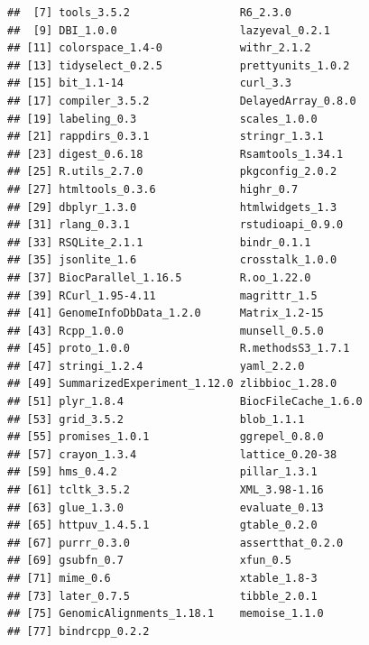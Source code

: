 \documentclass[12pt]{article}\usepackage[]{graphicx}\usepackage[]{color}
\makeatletter
\newenvironment{kframe}{%
 \def\at@end@of@kframe{}%
 \ifinner\ifhmode%
  \def\at@end@of@kframe{\end{minipage}}%
  \begin{minipage}{\columnwidth}%
 \fi\fi%
 \def\FrameCommand##1{\hskip\@totalleftmargin \hskip-\fboxsep
 \colorbox{shadecolor}{##1}\hskip-\fboxsep
     \hskip-\linewidth \hskip-\@totalleftmargin \hskip\columnwidth}%
 \MakeFramed {\advance\hsize-\width
   \@totalleftmargin\z@ \linewidth\hsize
   \@setminipage}}%
 {\par\unskip\endMakeFramed%
 \at@end@of@kframe}
\newenvironment{knitrout}{}{} %
\makeatother
\begin{document}
\begin{knitrout}
\begin{kframe}
\begin{verbatim}
##  [7] tools_3.5.2                 R6_2.3.0                   
##  [9] DBI_1.0.0                   lazyeval_0.2.1             
## [11] colorspace_1.4-0            withr_2.1.2                
## [13] tidyselect_0.2.5            prettyunits_1.0.2          
## [15] bit_1.1-14                  curl_3.3                   
## [17] compiler_3.5.2              DelayedArray_0.8.0         
## [19] labeling_0.3                scales_1.0.0               
## [21] rappdirs_0.3.1              stringr_1.3.1              
## [23] digest_0.6.18               Rsamtools_1.34.1           
## [25] R.utils_2.7.0               pkgconfig_2.0.2            
## [27] htmltools_0.3.6             highr_0.7                  
## [29] dbplyr_1.3.0                htmlwidgets_1.3            
## [31] rlang_0.3.1                 rstudioapi_0.9.0           
## [33] RSQLite_2.1.1               bindr_0.1.1                
## [35] jsonlite_1.6                crosstalk_1.0.0            
## [37] BiocParallel_1.16.5         R.oo_1.22.0                
## [39] RCurl_1.95-4.11             magrittr_1.5               
## [41] GenomeInfoDbData_1.2.0      Matrix_1.2-15              
## [43] Rcpp_1.0.0                  munsell_0.5.0              
## [45] proto_1.0.0                 R.methodsS3_1.7.1          
## [47] stringi_1.2.4               yaml_2.2.0                 
## [49] SummarizedExperiment_1.12.0 zlibbioc_1.28.0            
## [51] plyr_1.8.4                  BiocFileCache_1.6.0        
## [53] grid_3.5.2                  blob_1.1.1                 
## [55] promises_1.0.1              ggrepel_0.8.0              
## [57] crayon_1.3.4                lattice_0.20-38            
## [59] hms_0.4.2                   pillar_1.3.1               
## [61] tcltk_3.5.2                 XML_3.98-1.16              
## [63] glue_1.3.0                  evaluate_0.13              
## [65] httpuv_1.4.5.1              gtable_0.2.0               
## [67] purrr_0.3.0                 assertthat_0.2.0           
## [69] gsubfn_0.7                  xfun_0.5                   
## [71] mime_0.6                    xtable_1.8-3               
## [73] later_0.7.5                 tibble_2.0.1               
## [75] GenomicAlignments_1.18.1    memoise_1.1.0              
## [77] bindrcpp_0.2.2
\end{verbatim}
\end{kframe}
\end{knitrout}

\end{document}
